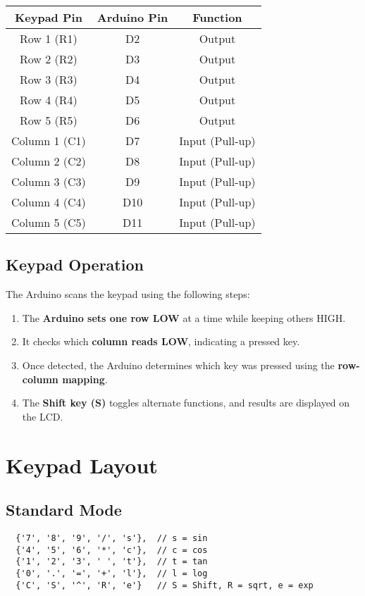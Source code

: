 \documentclass[journal,12pt,onecolumn]{IEEEtran}
\theoremstyle{remark}
\begin{document}
\begin{center}
\begin{tabular}{|c|c|c|}
\hline
\textbf{Keypad Pin} & \textbf{Arduino Pin} & \textbf{Function} \\
\hline
Row 1 (R1) & D2 & Output \\
Row 2 (R2) & D3 & Output \\
Row 3 (R3) & D4 & Output \\
Row 4 (R4) & D5 & Output \\
Row 5 (R5) & D6 & Output \\
Column 1 (C1) & D7 & Input (Pull-up) \\
Column 2 (C2) & D8 & Input (Pull-up) \\
Column 3 (C3) & D9 & Input (Pull-up) \\
Column 4 (C4) & D10 & Input (Pull-up) \\
Column 5 (C5) & D11 & Input (Pull-up) \\
\hline
\end{tabular}
\end{center}

\subsection{Keypad Operation}
The Arduino scans the keypad using the following steps:
\begin{enumerate}
    \item The \textbf{Arduino sets one row LOW} at a time while keeping others HIGH.
    \item It checks which \textbf{column reads LOW}, indicating a pressed key.
    \item Once detected, the Arduino determines which key was pressed using the \textbf{row-column mapping}.
    \item The \textbf{Shift key (S)} toggles alternate functions, and results are displayed on the LCD.
\end{enumerate}

\section{Keypad Layout}
\subsection{Standard Mode}
\begin{verbatim}
  {'7', '8', '9', '/', 's'},  // s = sin
  {'4', '5', '6', '*', 'c'},  // c = cos
  {'1', '2', '3', ' ', 't'},  // t = tan
  {'0', '.', '=', '+', 'l'},  // l = log
  {'C', 'S', '^', 'R', 'e'}   // S = Shift, R = sqrt, e = exp
\end{verbatim}
\end{document}
